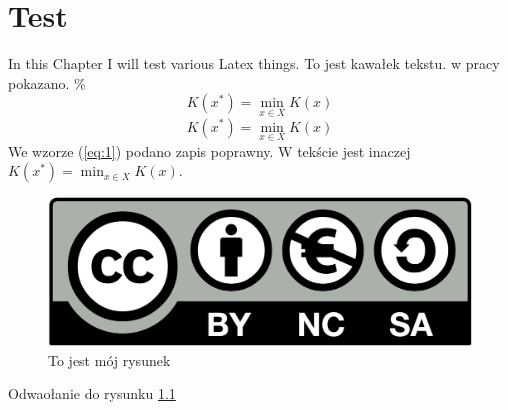 \chapter{Test}

In this Chapter I will test various Latex things. 
To jest kawałek tekstu. w pracy 
pokazano.
\%
$$
K(x^*)=\min_{x\in X}K(x)  
$$
\begin{equation}
K(x^*)=\min_{x\in X}K(x)  
\label{eq:1}
\end{equation}
We wzorze (\ref{eq:1}) podano zapis poprawny. W tekście jest inaczej $K(x^*)=\min_{x\in X}K(x)$.

\begin{figure}[H]
    \centering
    \includegraphics[width=\textwidth]{by-nc-sa.png}
    \caption[To jest inny podpis]{To jest mój rysunek}
    \label{fig:my_label}
\end{figure}
Odwaołanie do rysunku \ref{fig:my_label}
